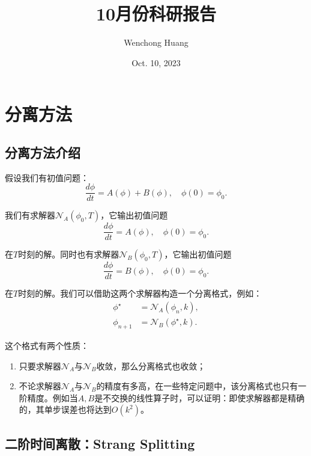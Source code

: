 \documentclass[lang=cn,10pt,bibend=bibtex]{elegantbook}
\title{10月份科研报告}
\author{Wenchong Huang}
\date{Oct. 10, 2023}
\begin{document}
\maketitle
\frontmatter

\tableofcontents

\mainmatter

\chapter{分离方法}

\section{分离方法介绍}

假设我们有初值问题：
\begin{equation}
    \frac{d\phi}{dt}=A(\phi)+B(\phi),\quad \phi(0)=\phi_0.
\end{equation}

我们有求解器$\mathcal{N}_A(\phi_0,T)$，它输出初值问题
\begin{equation}
    \frac{d\phi}{dt}=A(\phi),\quad \phi(0)=\phi_0.
\end{equation}

在$T$时刻的解。同时也有求解器$\mathcal{N}_B(\phi_0,T)$，它输出初值问题
\begin{equation}
    \frac{d\phi}{dt}=B(\phi),\quad \phi(0)=\phi_0.
\end{equation}

在$T$时刻的解。我们可以借助这两个求解器构造一个分离格式，例如：
\begin{align*}
    \phi^\star &= \mathcal{N}_A(\phi_n,k),\\
    \phi_{n+1} &= \mathcal{N}_B(\phi^\star,k).
\end{align*}

这个格式有两个性质：
\begin{enumerate}
    \item 只要求解器$\mathcal{N}_A$与$\mathcal{N}_B$收敛，那么分离格式也收敛；
    \item 不论求解器$\mathcal{N}_A$与$\mathcal{N}_B$的精度有多高，在一些特定问题中，该分离格式也只有一阶精度。例如当$A,B$是不交换的线性算子时，可以证明：即使求解器都是精确的，其单步误差也将达到$O(k^2)$。
\end{enumerate}

\section{二阶时间离散：Strang Splitting}
\end{document}
